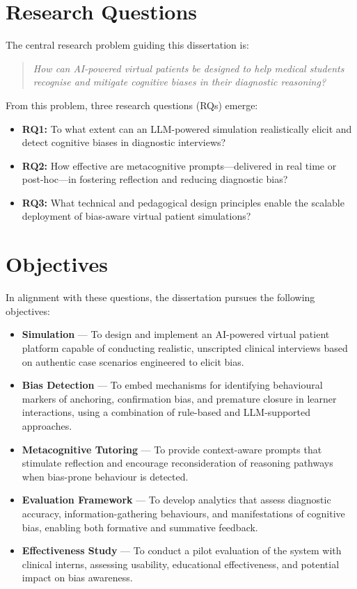 \section{Research Questions} 
\label{sec:rq}

The central research problem guiding this dissertation is: 

\begin{quote}
\textit{How can AI-powered virtual patients be designed to help medical students
recognise and mitigate cognitive biases in their diagnostic reasoning?}
\end{quote}

From this problem, three research questions (RQs) emerge:

\begin{itemize}
    \item \textbf{RQ1:} To what extent can an LLM-powered simulation realistically
    elicit and detect cognitive biases in diagnostic interviews?
    \item \textbf{RQ2:} How effective are metacognitive prompts—delivered in real
    time or post-hoc—in fostering reflection and reducing diagnostic bias?
    \item \textbf{RQ3:} What technical and pedagogical design principles enable
    the scalable deployment of bias-aware virtual patient simulations?
\end{itemize}

\section{Objectives} 
\label{sec:ae2}

In alignment with these questions, the dissertation pursues the following
objectives:

\begin{itemize}
\item \textbf{Simulation} --- To design and implement an AI-powered virtual
patient platform capable of conducting realistic, unscripted clinical interviews
based on authentic case scenarios engineered to elicit bias.
\item \textbf{Bias Detection} --- To embed mechanisms for identifying behavioural
markers of anchoring, confirmation bias, and premature closure in learner
interactions, using a combination of rule-based and LLM-supported approaches.
\item \textbf{Metacognitive Tutoring} --- To provide context-aware prompts that
stimulate reflection and encourage reconsideration of reasoning pathways when
bias-prone behaviour is detected.
\item \textbf{Evaluation Framework} --- To develop analytics that assess
diagnostic accuracy, information-gathering behaviours, and manifestations of
cognitive bias, enabling both formative and summative feedback.
\item \textbf{Effectiveness Study} --- To conduct a pilot evaluation of the
system with clinical interns, assessing usability, educational effectiveness,
and potential impact on bias awareness.
\end{itemize}


